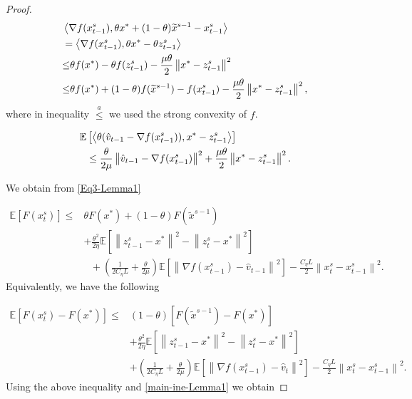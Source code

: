 \documentclass{article}
\newcommand*{\E}{\mathbb{E}}
\newcommand{\norm}[1]{\left\lVert#1\right\rVert}
\newcommand{\Iprod}[2]{\left\langle #1,#2\right\rangle}
\theoremstyle{definition}
\theoremstyle{remark}
\begin{document}
{\begin{proof}
\begin{align}\label{Eq4-Lemma1}
&\Iprod{\nabla f(x_{t-1}^s)}{\theta x^*+(1-\theta)\widetilde{x}^{s-1}-{x}^{s}_{t-1}}\notag\\
&= \Iprod{\nabla f(x_{t-1}^s)}{\theta x^*-\theta{z}^{s}_{t-1}}\\
&{\leq} \theta f(x^*)-\theta f(z_{t-1}^s)-\frac{\mu\theta}{2}\norm{x^*-z_{t-1}^s}^2\\
&{\leq} \theta f(x^*)+(1-\theta)f(\widetilde{x}^{s-1})-f(x_{t-1}^s)-\frac{\mu\theta}{2}\norm{x^*-z_{t-1}^s}^2,
\end{align}
where in inequality $\stackrel{a}{\leq}$ we used the strong convexity of $f$. 

\begin{equation}\label{Eq4-Lemma1}
\begin{split}
\E&\left[\Iprod{\theta(\hat{v}_{t-1}-\nabla f(x_{t-1}^s))}{x^* - z_{t-1}^s}\right] \\
&\leq \frac{\theta}{2\mu} \norm{\hat{v}_{t-1}-\nabla f(x_{t-1}^s)}^2+\frac{\mu\theta}{2}\norm{x^* - z_{t-1}^s}^2.
\end{split}
\raisetag{15pt}
\end{equation}

We obtain from \eqref{Eq3-Lemma1}

\begin{equation}
\begin{split}
\E[F(x_{t}^s)] \leq &\theta F(x^*)+(1-\theta)F(\widetilde{x}^{s-1})\\
&+ {\frac{\theta^2}{2\eta}}\E[\norm{z_{t-1}^s-x^*}^2-\norm{z_{t}^s-x^*}^2]\\
&~~~+(\frac{1}{2C_{\eta} L}+\frac{\theta}{2\mu})\E\left[\norm{\nabla f(x_{t-1}^s)-\hat{v}_{t-1}}^2\right]-\frac{C_{\eta} L}{2}\norm{x_{t}^s-x_{t-1}^s}^2. 
\end{split}
\end{equation}
Equivalently, we have the following

\begin{equation}\label{main-ine-Lemma1}
\begin{split}
\E[F(x_{t}^s)-F(x^*)] \leq &(1-\theta)[F(\widetilde{x}^{s-1})-F(x^*)] \\
&+ {\frac{ \theta^2}{2\eta}}\E[\norm{z_{t-1}^s-x^*}^2-\norm{z_{t}^s-x^*}^2]\\
&+(\frac{1}{2C_{\eta} L}+\frac{\theta}{2\mu})\E\left[\norm{\nabla f(x_{t-1}^s)-\hat{v}_{t}}^2\right]-\frac{C_{\eta} L}{2}\norm{x_{t}^s-x_{t-1}^s}^2. 
\end{split}
\end{equation}
Using the above inequality and \eqref{main-ine-Lemma1} we obtain


\end{proof}}
\end{document}
